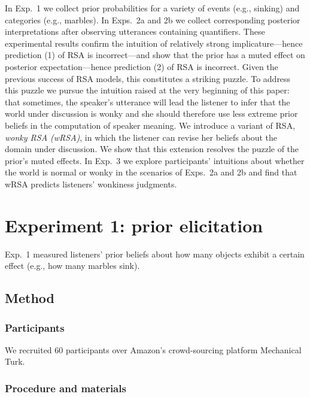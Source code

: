 \documentclass[10pt,letterpaper]{article}
\begin{document}
In Exp.~1 we collect prior probabilities for a variety of events (e.g., sinking) and categories (e.g., marbles). In Exps.~2a and 2b we collect corresponding posterior interpretations after observing  utterances containing quantifiers. These experimental results confirm the intuition of relatively strong implicature---hence prediction (1) of RSA is incorrect---and show that the prior has a muted effect on posterior expectation---hence prediction (2) of RSA is incorrect.
Given the previous success of RSA models, this constitutes a striking puzzle. 
To address this puzzle we pursue the intuition raised at the very beginning of this paper: that sometimes, the speaker's utterance will lead the listener to infer that the world under discussion is wonky and she should therefore use less extreme prior beliefs in the computation of speaker meaning. We introduce a variant of RSA, \emph{wonky RSA (wRSA)}, in which the listener can revise her beliefs about the domain under discussion. We show that this extension resolves the puzzle of the prior's muted effects.
In Exp.~3 we explore participants' intuitions about whether the world is normal or wonky in the scenarios of Exps.~2a and 2b and find that wRSA predicts listeners' wonkiness judgments.


\section{Experiment 1: prior elicitation} 

Exp.~1 measured listeners' prior beliefs about how many objects exhibit a certain effect (e.g., how many marbles sink).%

\subsection{Method}

\subsubsection{Participants}
We recruited 60 participants over Amazon's crowd-sourcing platform Mechanical Turk.

\subsubsection{Procedure and materials}
\end{document}
